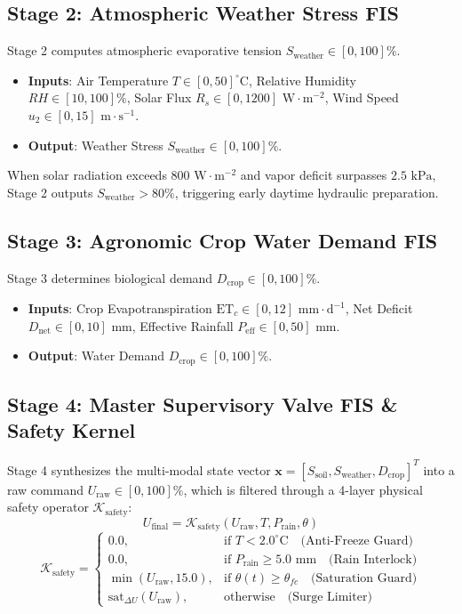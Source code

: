 \documentclass[conference]{IEEEtran}
\begin{document}
\subsection{Stage 2: Atmospheric Weather Stress FIS}
Stage 2 computes atmospheric evaporative tension $S_{\text{weather}} \in [0, 100]\%$.
\begin{itemize}
    \item \textbf{Inputs}: Air Temperature $T \in [0, 50]^\circ\text{C}$, Relative Humidity $RH \in [10, 100]\%$, Solar Flux $R_s \in [0, 1200]\text{ W}\cdot\text{m}^{-2}$, Wind Speed $u_2 \in [0, 15]\text{ m}\cdot\text{s}^{-1}$.
    \item \textbf{Output}: Weather Stress $S_{\text{weather}} \in [0, 100]\%$.
\end{itemize}
When solar radiation exceeds $800\text{ W}\cdot\text{m}^{-2}$ and vapor deficit surpasses $2.5\text{ kPa}$, Stage 2 outputs $S_{\text{weather}} > 80\%$, triggering early daytime hydraulic preparation.

\subsection{Stage 3: Agronomic Crop Water Demand FIS}
Stage 3 determines biological demand $D_{\text{crop}} \in [0, 100]\%$.
\begin{itemize}
    \item \textbf{Inputs}: Crop Evapotranspiration $\text{ET}_c \in [0, 12]\text{ mm}\cdot\text{d}^{-1}$, Net Deficit $D_{\text{net}} \in [0, 10]\text{ mm}$, Effective Rainfall $P_{\text{eff}} \in [0, 50]\text{ mm}$.
    \item \textbf{Output}: Water Demand $D_{\text{crop}} \in [0, 100]\%$.
\end{itemize}

\subsection{Stage 4: Master Supervisory Valve FIS \& Safety Kernel}
Stage 4 synthesizes the multi-modal state vector $\mathbf{x} = [S_{\text{soil}}, S_{\text{weather}}, D_{\text{crop}}]^T$ into a raw command $U_{\text{raw}} \in [0, 100]\%$, which is filtered through a 4-layer physical safety operator $\mathcal{K}_{\text{safety}}$:
\begin{equation}
U_{\text{final}} = \mathcal{K}_{\text{safety}}\left(U_{\text{raw}}, T, P_{\text{rain}}, \theta\right)
\label{eq:safety_kernel}
\end{equation}
\begin{equation}
\mathcal{K}_{\text{safety}} = \begin{cases}
0.0, & \text{if } T < 2.0^\circ\text{C} \quad \text{(Anti-Freeze Guard)} \\
0.0, & \text{if } P_{\text{rain}} \ge 5.0\text{ mm} \quad \text{(Rain Interlock)} \\
\min(U_{\text{raw}}, 15.0), & \text{if } \theta(t) \ge \theta_{fc} \quad \text{(Saturation Guard)} \\
\text{sat}_{\Delta U}(U_{\text{raw}}), & \text{otherwise} \quad \text{(Surge Limiter)}
\end{cases}
\end{equation}
\end{document}
